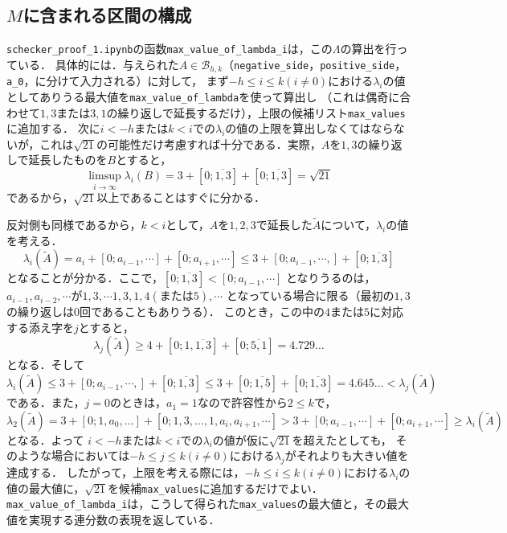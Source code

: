 \documentclass[10pt,a4paper]{ujarticle}
\theoremstyle{definition}
\begin{document}
\subsection{$M$に含まれる区間の構成}

\verb|schecker_proof_1.ipynb|の函数\verb|max_value_of_lambda_i|は，この$\Lambda$の算出を行っている．
具体的には．与えられた$A\in \mathcal{B}_{h,k}$（\verb|negative_side|，\verb|positive_side|，\verb|a_0|，に分けて入力される）に対して，
まず$-h \le i \le k(i\neq 0)$における$\lambda_i$の値としてありうる最大値を\verb|max_value_of_lambda|を使って算出し
（これは偶奇に合わせて$1,3$または$3,1$の繰り返しで延長するだけ），上限の候補リスト\verb|max_values|に追加する．
次に$i < -h$または$k < i$での$\lambda_i$の値の上限を算出しなくてはならないが，これは$\sqrt{21}$の可能性だけ考慮すれば十分である．実際，$A$を$1, 3$の繰り返しで延長したものを$B$とすると，
\[
\limsup_{i\to\infty}\lambda_i (B) = 3 + [0;\overline{1,3}] + [0;\overline{1,3}] = \sqrt{21}
\]
であるから，$\sqrt{21}$以上であることはすぐに分かる．

反対側も同様であるから，$k < i$として，$A$を$1,2,3$で延長した$\tilde{A}$について，$\lambda_i$の値を考える．
\[
\lambda_i(\tilde{A}) = a_i + [0;a_{i-1},\cdots] +  [0;a_{i+1},\cdots]\le 3 + [0;a_{i-1},\cdots,] + [0;\overline{1,3}]
\]
となることが分かる．ここで，$ [0;\overline{1,3}] <  [0;a_{i-1},\cdots] $ となりうるのは，
$a_{i-1}, a_{i-2}, \cdots$が$1, 3 , \cdots 1,3, 1, 4(または5), \cdots$ となっている場合に限る（最初の$1, 3$の繰り返しは$0$回であることもありうる）．
このとき，この中の$4$または$5$に対応する添え字を$j$とすると，
\[
\lambda_j(\tilde{A})  \ge 4 + [0; 1, \overline{1, 3}] + [0; \overline{5, 1}] = 4.729 \dots
\]
となる．そして
\[
\lambda_i(\tilde{A}) \le 3 + [0;a_{i-1},\cdots,] + [0;\overline{1,3}] \le 3 +[0;\overline{1,5}] +[0;\overline{1,3}] = 4.645 \dots < \lambda_j(\tilde{A}) 
\]
である．また，$j = 0$のときは，$a_1 = 1$なので許容性から$2 \le k$で，
\[
\lambda_2(\tilde{A}) = 3 + [0;1,a_0,\dots] + [0;1,3,\dots,1,a_i, a_{i+1},\cdots] 
> 3 + [0;a_{i-1},\cdots] + [0;a_{i+1},\cdots] \ge \lambda_i(\tilde{A})
\]
となる．よって
$i < -h$または$k < i$での$\lambda_i$の値が仮に$\sqrt{21}$を超えたとしても，
そのような場合においては$-h\le j \le k(i\neq 0)$における$\lambda_j$がそれよりも大きい値を達成する．
したがって，上限を考える際には，$-h \le i \le k(i\neq 0)$における$\lambda_i$の値の最大値に，$\sqrt{21}$を候補\verb|max_values|に追加するだけでよい．
\verb|max_value_of_lambda_i|は，こうして得られた\verb|max_values|の最大値と，その最大値を実現する連分数の表現を返している．
\end{document}
